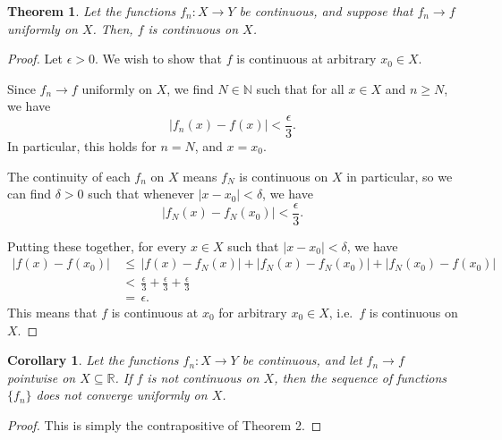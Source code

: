\documentclass[10pt]{article}
\def\R{\mathbb{R}}
\def\N{\mathbb{N}}
\newtheorem{theorem}{Theorem}
\newtheorem{corollary}{Corollary}[theorem]
\begin{document}
    \begin{theorem}
        Let the functions $f_n\colon X \to Y$ be continuous, and suppose that 
        $f_n \to f$ uniformly on $X$. Then, $f$ is continuous on
        $X$.
    \end{theorem}
    \begin{proof}
        Let $\epsilon > 0$. We wish to show that $f$ is continuous at 
        arbitrary $x_0 \in X$.
        
        Since $f_n \to f$ uniformly on $X$, we find $N \in \N$ such that for all $x
        \in X$ and $n \geq N$, we have \[
            |f_n(x) - f(x)| < \frac{\epsilon}{3}.
        \] In particular, this holds for $n = N$, and $x = x_0$.
        
        The continuity of each $f_n$ on $X$ means $f_N$ is
        continuous on $X$ in particular, so we can find $\delta > 0$ such that 
        whenever $|x - x_0| < \delta$, we have \[
            |f_N(x) - f_N(x_0)| < \frac{\epsilon}{3}.
        \]

        Putting these together, for every $x \in X$ such that $|x - x_0| < \delta$,
        we have
        \begin{align*}
            |f(x) - f(x_0)| 
                \,&\leq\, |f(x) - f_N(x)| + |f_N(x) - f_N(x_0)| + 
                    |f_N(x_0) - f(x_0)| \\
                \,&<\, \frac{\epsilon}{3} + \frac{\epsilon}{3} +
                    \frac{\epsilon}{3} \\
                \,&=\, \epsilon.
        \end{align*}
        This means that $f$ is continuous at $x_0$ for arbitrary $x_0 \in X$, i.e.\
        $f$ is continuous on $X$.
    \end{proof}
    \begin{corollary}
        Let the functions $f_n\colon X \to Y$ be continuous, and let $f_n \to f$
        pointwise on $X \subseteq \R$. If $f$ is not continuous on $X$, then the
        sequence of functions $\{f_n\}$ does not converge uniformly on $X$.
    \end{corollary}
    \begin{proof}
        This is simply the contrapositive of Theorem 2.
    \end{proof}
\end{document}
